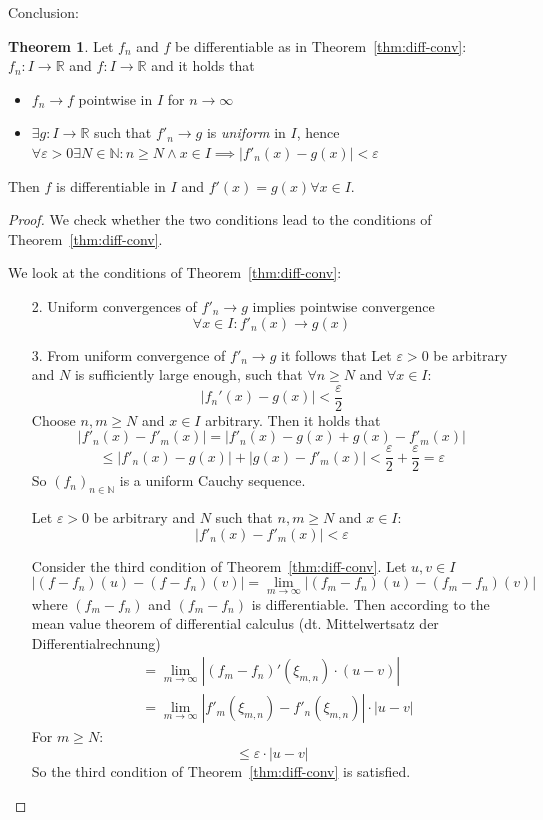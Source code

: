 \documentclass[a4paper,landscape,twocolumn]{article}
\theoremstyle{definition}
\newtheorem{theorem}{Theorem}
\newcommand\abs[1]{\left|#1\right|}
\begin{document}
Conclusion:
\begin{theorem}
  \label{thm:concl}
  Let $f_n$ and $f$ be differentiable as in Theorem~\ref{thm:diff-conv}:
  $f_n: I \to \mathbb R$ and $f: I \to \mathbb R$ and it holds that
  \begin{itemize}
    \item $f_n \to f$ pointwise in $I$ for $n \to \infty$
    \item $\exists g: I  \to \mathbb R$ such that $f'_n \to g$ is \emph{uniform} in $I$,
      hence $\forall \varepsilon > 0 \exists N \in \mathbb N:
      n \geq N \land x \in I \implies \abs{f'_n(x) - g(x)} < \varepsilon$
  \end{itemize}
  Then $f$ is differentiable in $I$ and $f'(x) = g(x) \forall x \in I$.
\end{theorem}
\begin{proof}
  We check whether the two conditions lead to the conditions of Theorem~\ref{thm:diff-conv}.

  We look at the conditions of Theorem~\ref{thm:diff-conv}:
  \begin{itemize}
    \item[2.] Uniform convergences of $f'_n \to g$ implies pointwise convergence
      \[ \forall x \in I: f'_n(x) \to g(x) \]
    \item[3.] From uniform convergence of $f'_n \to g$ it follows that
      Let $\varepsilon > 0$ be arbitrary and $N$ is sufficiently large enough, such that
      $\forall n \geq N$ and $\forall x \in I$:
      \[ \abs{f_n'(x) - g(x)} < \frac\varepsilon2 \]
      Choose $n,m \geq N$ and $x \in I$ arbitrary. Then it holds that
      \[ \abs{f'_n(x) - f'_m(x)} = \abs{f'_n(x) - g(x) + g(x) - f'_m(x)} \]
      \[ \leq \abs{f'_n(x) - g(x)} + \abs{g(x) - f'_m(x)} < \frac\varepsilon2 + \frac\varepsilon2 = \varepsilon \]
      So $(f_n)_{n\in\mathbb N}$ is a uniform Cauchy sequence.

      Let $\varepsilon > 0$ be arbitrary and $N$ such that $n,m \geq N$ and $x \in I$:
      \[ \abs{f'_n(x) - f'_m(x)} < \varepsilon \]

      Consider the third condition of Theorem~\ref{thm:diff-conv}. Let $u,v \in I$
      \[ \abs{(f - f_n)(u) - (f - f_n)(v)} = \lim_{m\to\infty} \abs{(f_m - f_n)(u) - (f_m - f_n)(v)} \]
      where $(f_m - f_n)$ and $(f_m - f_n)$ is differentiable. Then according to the
      mean value theorem of differential calculus (dt. Mittelwertsatz der Differentialrechnung)
      \begin{align*}
        &= \lim_{m\to\infty} \abs{(f_m - f_n)'(\xi_{m,n}) \cdot (u - v)} \\
        &= \lim_{m\to\infty} \abs{f'_m(\xi_{m,n}) - f'_n(\xi_{m,n})} \cdot \abs{u - v}
      \end{align*}
      For $m \geq N$:
      \[ \leq \varepsilon \cdot \abs{u - v} \]
      So the third condition of Theorem~\ref{thm:diff-conv} is satisfied.
  \end{itemize}
\end{proof}
\end{document}
